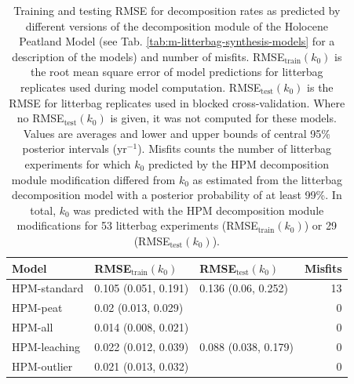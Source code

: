 \documentclass[esd, manuscript]{copernicus}
\begin{document}
\begin{table}[!h]

\caption{\label{tab:out-tab-sdm-all-models-rmse-1}Training and testing RMSE for decomposition rates as predicted by different versions of the decomposition module of the Holocene Peatland Model (see Tab. \ref{tab:m-litterbag-synthesis-models} for a description of the models) and number of misfits. RMSE\(_\text{train}(k_0)\) is the root mean square error of model predictions for litterbag replicates used during model computation. RMSE\(_\text{test}(k_0)\) is the RMSE for litterbag replicates used in blocked cross-validation. Where no RMSE\(_\text{test}(k_0)\) is given, it was not computed for these models. Values are averages and lower and upper bounds of central 95\% posterior intervals (yr\(^{-1}\)). Misfits counts the number of litterbag experiments for which \(k_0\) predicted by the HPM decomposition module modification differed from \(k_0\) as estimated from the litterbag decomposition model with a posterior probability of at least 99\%. In total, \(k_0\) was predicted with the HPM decomposition module modifications for 53 litterbag experiments (RMSE\(_\text{train}(k_0)\)) or 29 (RMSE\(_\text{test}(k_0)\)).}
\centering
\begin{tabular}[t]{lllr}
\toprule
Model & RMSE$_\text{train}(k_0)$ & RMSE$_\text{test}(k_0)$ & Misfits\\
\midrule
HPM-standard & 0.105 (0.051, 0.191) & 0.136 (0.06, 0.252) & 13\\
HPM-peat & 0.02 (0.013, 0.029) &  & 0\\
HPM-all & 0.014 (0.008, 0.021) &  & 0\\
HPM-leaching & 0.022 (0.012, 0.039) & 0.088 (0.038, 0.179) & 0\\
HPM-outlier & 0.021 (0.013, 0.032) &  & 0\\
\bottomrule
\end{tabular}
\end{table}

\clearpage
\end{document}
